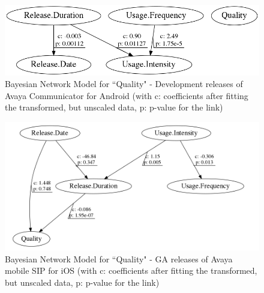 \documentclass[smallcondensed]{svjour3}     %
\begin{document}
\begin{figure}[!t]
\centering
\includegraphics[width=0.6\linewidth]{qAD}%
\caption{Bayesian Network  Model for ``Quality" - Development releases of Avaya Communicator for Android (with c: coefficients after fitting the transformed, but unscaled data, p: p-value  for the link)}
\label{fig:bn2AD}
\vspace{-10pt}
\end{figure}

\begin{figure}[!t]
\centering
\includegraphics[width=0.6\linewidth]{qI}%
\caption{Bayesian Network  Model for ``Quality" - GA releases of Avaya mobile SIP for iOS (with c: coefficients after fitting the transformed, but unscaled data, p: p-value  for the link)}
\label{fig:bn2I}
\vspace{-10pt}
\end{figure}
\end{document}
